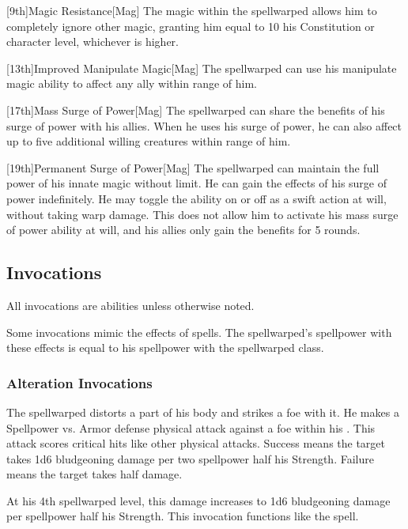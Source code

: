         [9th]{Magic Resistance}[Mag]
        The magic within the spellwarped allows him to completely ignore other magic, granting him  equal to 10 \add his Constitution or character level, whichever is higher.

        [13th]{Improved Manipulate Magic}[Mag]
        The spellwarped can use his manipulate magic ability to affect any ally within \rngmed range of him.

        [17th]{Mass Surge of Power}[Mag]
        The spellwarped can share the benefits of his surge of power with his allies.
        When he uses his surge of power, he can also affect up to five additional willing creatures within \rngmed range of him.

        [19th]{Permanent Surge of Power}[Mag]
        The spellwarped can maintain the full power of his innate magic without limit.
        He can gain the effects of his surge of power indefinitely.
        He may toggle the ability on or off as a swift action at will, without taking warp damage.
        This does not allow him to activate his mass surge of power ability at will, and his allies only gain the benefits for 5 rounds.

    \subsection{Invocations}\label{Invocations}

        All invocations are  abilities unless otherwise noted.

        Some invocations mimic the effects of spells.
        The spellwarped's spellpower with these effects is equal to his spellpower with the spellwarped class.

        \subsubsection{Alteration Invocations}
            The spellwarped distorts a part of his body and strikes a foe with it.
            He makes a Spellpower vs. Armor defense physical attack against a foe within his .
            This attack scores critical hits like other physical attacks.
            Success means the target takes 1d6 bludgeoning damage per two spellpower \add half his Strength.
            Failure means the target takes half damage.
            \par At his 4th spellwarped level, this damage increases to 1d6 bludgeoning damage per spellpower \add half his Strength.
            This invocation functions like the  spell.

